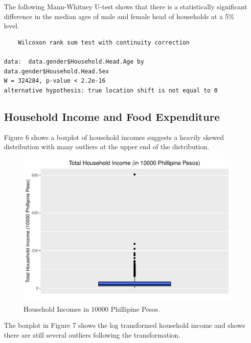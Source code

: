 \documentclass[
]{article}
\begin{document}
The following Mann-Whitney U-test shows that there is a statistically
significant difference in the median ages of male and female head of
households at a 5\% level.

\begin{verbatim}
    Wilcoxon rank sum test with continuity correction

data:  data.gender$Household.Head.Age by data.gender$Household.Head.Sex
W = 324284, p-value < 2.2e-16
alternative hypothesis: true location shift is not equal to 0
\end{verbatim}

\hypertarget{household-income-and-food-expenditure}{%
\subsection{Household Income and Food
Expenditure}\label{household-income-and-food-expenditure}}

Figure 6 shows a boxplot of household incomes suggests a heavily skewed
distribution with many outliers at the upper end of the distribution.

\begin{figure}[H]

{\centering \includegraphics[width=0.8\linewidth]{Group_01_files/figure-latex/balance boxplot-1} 

}

\caption{Household Incomes in 10000 Phillipine Pesos.}\label{fig:balance boxplot}
\end{figure}

The boxplot in Figure 7 shows the log transformed household income and
shows there are still several outliers following the transformation.
\end{document}
